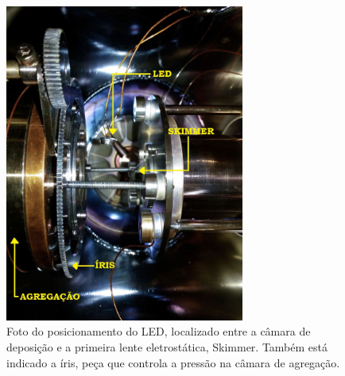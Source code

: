 \begin{figure}
  \centering
  \includegraphics[width=0.7\textwidth]{images/foca/led_montagem}
  \caption{Foto do posicionamento do LED, localizado entre a câmara de deposição e a primeira lente eletrostática, Skimmer. Também está indicado a íris, peça que controla a pressão na câmara de agregação.}
  \label{fig:led_montagem}
\end{figure}


